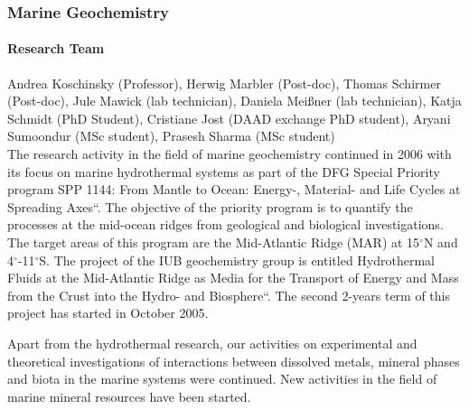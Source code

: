 \subsubsection{Marine Geochemistry}

\paragraph{Research Team}
Andrea Koschinsky (Professor), Herwig Marbler (Post-doc),
Thomas Schirmer (Post-doc), Jule Mawick (lab technician), Daniela
Mei\ss ner (lab technician), Katja Schmidt (PhD Student), Cristiane Jost
(DAAD exchange PhD student), Aryani Sumoondur (MSc student), Prasesh
Sharma (MSc student) \\

The research activity in the field of marine geochemistry continued in
2006 with its focus on marine hydrothermal systems as part of the DFG
Special Priority program SPP 1144: \quotedblbase{}From Mantle to
Ocean: Energy-, Material- and Life Cycles at Spreading Axes``. The
objective of the priority program is to quantify the processes at the
mid-ocean ridges from geological and biological investigations. The
target areas of this program are the Mid-Atlantic Ridge (MAR) at 15$^\circ$N
and 4$^\circ$-11$^\circ$S. The project of the IUB geochemistry group is entitled
\quotedblbase{}Hydrothermal Fluids at the Mid-Atlantic Ridge as Media
for the Transport of Energy and Mass from the Crust into the Hydro-
and Biosphere``. The second 2-years term of this project has started
in October 2005.

Apart from the hydrothermal research, our activities on experimental
and theoretical investigations of interactions between dissolved
metals, mineral phases and biota in the marine systems were
continued. New activities in the field of marine mineral resources
have been started.

